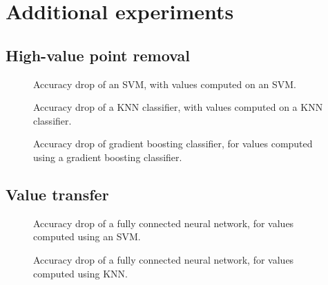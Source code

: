 \documentclass[10pt]{article}
\begin{document}


\appendix\section{Additional experiments}

\subsection{High-value point removal}\label{app:high-value}

\begin{figure}[h]
  \caption{\label{fig:acc-svm-svm}Accuracy drop of an SVM, with values
  computed on an SVM.}
\end{figure}

\begin{figure}[h]
  \caption{\label{fig:acc-knn-knn}Accuracy drop of a KNN classifier, with
  values computed on a KNN classifier.}
\end{figure}

\begin{figure}[h]
  \caption{\label{fig:acc-mlp-mlp}Accuracy drop of gradient boosting
  classifier, for values computed using a gradient boosting classifier.}
\end{figure}

\subsection{Value transfer}\label{app:value-transfer}

\begin{figure}[h]
  \caption{\label{fig:transfer-svm-mlp}Accuracy drop of a fully connected
  neural network, for values computed using an SVM.}
\end{figure}

\begin{figure}[h]
  \caption{\label{fig:transfer-knn-mlp}Accuracy drop of a fully connected
  neural network, for values computed using KNN.}
\end{figure}
\end{document}
